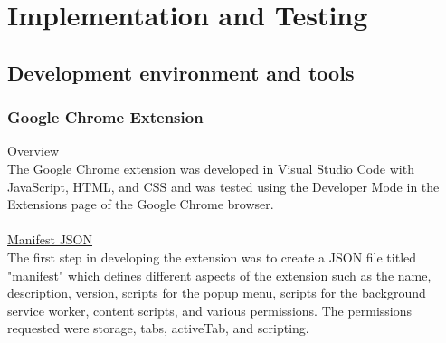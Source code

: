 \documentclass[12pt]{article}
\begin{document}
\section{Implementation and Testing}
\subsection{Development environment and tools}
\subsubsection{Google Chrome Extension}
\noindent \underline{Overview} \\
The Google Chrome extension was developed in Visual Studio Code with JavaScript, HTML, and CSS
and was tested using the Developer Mode in the Extensions page of the Google Chrome browser. 
\\\\
\underline{Manifest JSON}\\
The first step in developing the extension was to create a JSON file titled "manifest" which  
defines different aspects of the extension such as the name, description, version, scripts for the popup menu, 
scripts for the background service worker, content scripts, and various permissions. The permissions requested were storage, tabs, activeTab, and scripting.
\\\\
\end{document}
